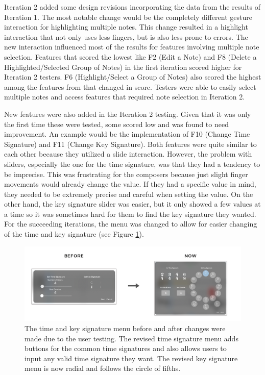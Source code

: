 			Iteration 2 added some design revisions incorporating the data from the results of Iteration 1. The most notable change would be the completely different gesture interaction for highlighting multiple notes. This change resulted in a highlight interaction that not only uses less fingers, but is also less prone to errors. The new interaction influenced most of the results for features involving multiple note selection. Features that scored the lowest like F2 (Edit a Note) and F8 (Delete a Highlighted/Selected Group of Notes) in the first iteration scored higher for Iteration 2 testers. F6 (Highlight/Select a Group of Notes) also scored the highest among the features from that changed in score. Testers were able to easily select multiple notes and access features that required note selection in Iteration 2. 

			New features were also added in the Iteration 2 testing. Given that it was only the first time these were tested, some scored low and was found to need improvement. An example would be the implementation of F10 (Change Time Signature) and F11 (Change Key Signature). Both features were quite similar to each other because they utilized a slide interaction. However, the problem with sliders, especially the one for the time signature, was that they had a tendency to be imprecise. This was frustrating for the composers because just slight finger movements would already change the value. If they had a specific value in mind, they needed to be extremely precise and careful when setting the value. On the other hand, the key signature slider was easier, but it only showed a few values at a time so it was sometimes hard for them to find the key signature they wanted. For the succeeding iterations, the menu was changed to allow for easier changing of the time and key signature (see Figure \ref{fig:time-key-signature}).

			\begin{figure}[H]
				\centering
				\includegraphics[scale=0.25]{figures/before-after-timesigmenu}
			    \caption{The time and key signature menu before and after changes were made due to the user testing. The revised time signature menu adds buttons for the common time signatures and also allows users to input any valid time signature they want. The revised key signature menu is now radial and follows the circle of fifths.}
			    \label{fig:time-key-signature}
			\end{figure} 

